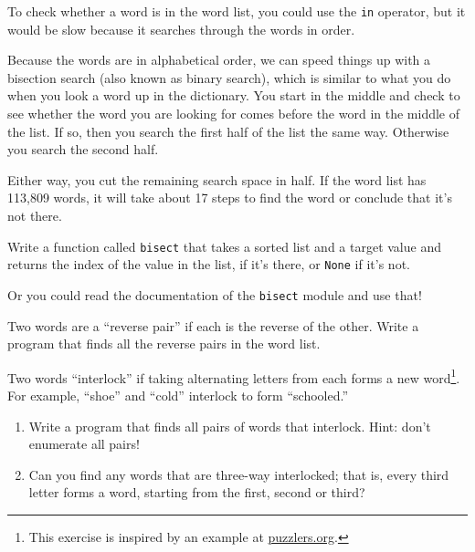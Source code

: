 \documentclass[10pt]{book}
\begin{document}
\begin{ex}
\label{wordlist1}
\label{bisection}



To check whether a word is in the word list, you could use
the {\tt in} operator, but it would be slow because it searches
through the words in order.

Because the words are in alphabetical order, we can speed things up
with a bisection search (also known as binary search), which is
similar to what you do when you look a word up in the dictionary.  You
start in the middle and check to see whether the word you are looking
for comes before the word in the middle of the list.  If so, then you
search the first half of the list the same way.  Otherwise you search
the second half.

Either way, you cut the remaining search space in half.  If the
word list has 113,809 words, it will take about 17 steps to
find the word or conclude that it's not there.

Write a function called {\tt bisect} that takes a sorted list
and a target value and returns the index of the value
in the list, if it's there, or {\tt None} if it's not.


Or you could read the documentation of the {\tt bisect} module
and use that!
\end{ex}

\begin{ex}

Two words are a ``reverse pair'' if each is the reverse of the
other.  Write a program that finds all the reverse pairs in the
word list. 
\end{ex}

\begin{ex}

Two words ``interlock'' if taking alternating letters from each forms
a new word\footnote{This exercise is inspired by an example at
  \url{puzzlers.org}.}.  For example, ``shoe'' and ``cold''
interlock to form ``schooled.''

\begin{enumerate}

\item Write a program that finds all pairs of words that interlock.
  Hint: don't enumerate all pairs!

\item Can you find any words that are three-way interlocked; that is,
  every third letter forms a word, starting from the first, second or
  third?

\end{enumerate}
\end{ex}
\end{document}
